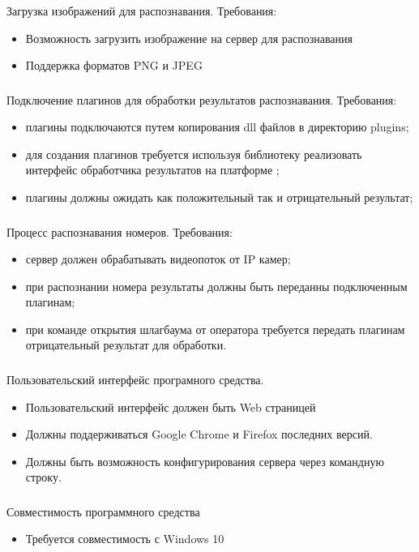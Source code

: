 \subsubsection{}
Загрузка изображений для распознавания. Требования:
\begin{itemize}
	\item Возможность загрузить изображение на сервер для распознавания
	\item Поддержка форматов PNG и JPEG
\end{itemize}


\subsubsection{}
Подключение плагинов для обработки результатов распознавания. Требования:
\begin{itemize}
	\item плагины подключаются путем копирования dll файлов в директорию plugins;
	\item для создания плагинов требуется используя библиотеку реализовать интерфейс обработчика результатов на платформе \dotnet{};
	\item плагины должны ожидать как положительный так и отрицательный результат;
\end{itemize}

\subsubsection{}
Процесс распознавания номеров. Требования:
\begin{itemize}
	\item сервер должен обрабатывать видеопоток от IP камер;
	\item при распознании номера результаты должны быть переданны подключенным плагинам;
	\item при команде открытия шлагбаума от оператора требуется передать плагинам отрицательный результат для обработки.
\end{itemize}

\subsubsection{}
Пользовательский интерфейс програмного средства.
\begin{itemize}
	\item Пользовательский интерфейс должен быть Web страницей
	\item Должны поддерживаться Google Chrome и Firefox последних версий.
	\item Должны быть возможность конфигурирования сервера через командную строку.
\end{itemize}

\subsubsection{}
Совместимость программного средства
\begin{itemize}
	\item Требуется совместимость с Windows 10
\end{itemize}
